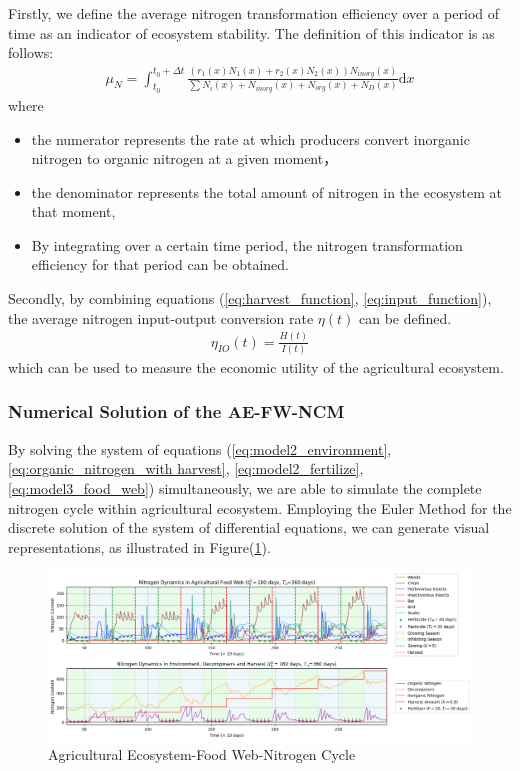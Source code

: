 \documentclass{mcmthesis}
\begin{document}
Firstly, we define the average nitrogen transformation efficiency over a period of time as an indicator of ecosystem stability. The definition of this indicator is as follows:
\begin{align}
\mu_N = \int_{t_0}^{t_0+\Delta t} \frac{(r_1(x)N_1(x) + r_2(x)N_2(x))N_{inorg}(x)}{\sum N_i(x) + N_{inorg}(x) + N_{org}(x) + N_D(x)}  \mathrm{d}x
\label{eq:evaluate_ecosystem}
\end{align}
where 
\begin{itemize}
    \item the numerator represents the rate at which producers convert inorganic nitrogen to organic nitrogen at a given moment，
    \item the denominator represents the total amount of nitrogen in the ecosystem at that moment,
    \item By integrating over a certain time period, the nitrogen transformation efficiency for that period can be obtained.
\end{itemize}
Secondly, by combining equations (\ref{eq:harvest_function}, 
\ref{eq:input_function}), the average nitrogen input-output conversion rate $\eta(t)$ can be defined.
\begin{align}
    \eta_{IO}(t) = \frac{H(t)}{I(t)}
    \label{eq:IO_rate}
\end{align}
which can be used to measure the economic utility of the agricultural ecosystem.

\subsubsection{Numerical Solution of the AE-FW-NCM}
By solving the system of equations (\ref{eq:model2_environment}, \ref{eq:organic_nitrogen_with harvest}, \ref{eq:model2_fertilize}, \ref{eq:model3_food_web}) simultaneously, we are able to simulate the complete nitrogen cycle within agricultural ecosystem. Employing the Euler Method for the discrete solution of the system of differential equations, we can generate visual representations, as illustrated in Figure(\ref{fig:model3_foodWeb_2Chem}).
\begin{figure}[ht] 
\centering
\includegraphics[width=\textwidth]{figures/model3_food_web_2Chem.png}
\setlength{\abovecaptionskip}{-0.5cm} 
\caption{Agricultural Ecosystem-Food Web-Nitrogen Cycle}
\label{fig:model3_foodWeb_2Chem}
\end{figure}
\end{document}
